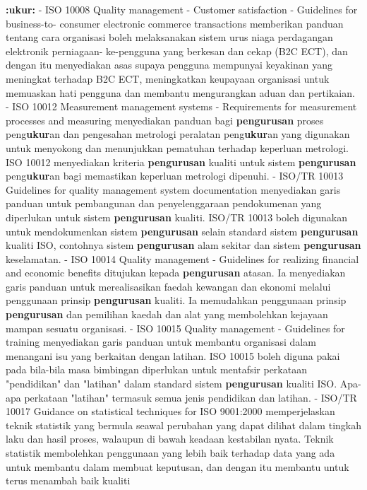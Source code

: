 \documentclass{article}
\begin{document}
\textbf{:ukur:} - ISO 10008 Quality management - Customer satisfaction - Guidelines for business-to-
 consumer electronic commerce transactions memberikan panduan tentang cara
 organisasi boleh melaksanakan sistem urus niaga perdagangan elektronik perniagaan-
 ke-pengguna yang berkesan dan cekap (B2C ECT), dan dengan itu menyediakan asas
 supaya pengguna mempunyai keyakinan yang meningkat terhadap B2C ECT,
 meningkatkan keupayaan organisasi untuk memuaskan hati pengguna dan membantu
 mengurangkan aduan dan pertikaian.
- ISO 10012 Measurement management systems - Requirements for measurement
 processes and measuring menyediakan panduan bagi \textbf{pengurusan} proses peng\textbf{ukur}an
 dan pengesahan metrologi peralatan peng\textbf{ukur}an yang digunakan untuk menyokong dan
 menunjukkan pematuhan terhadap keperluan metrologi. ISO 10012 menyediakan kriteria
 \textbf{pengurusan} kualiti untuk sistem \textbf{pengurusan} peng\textbf{ukur}an bagi memastikan keperluan
 metrologi dipenuhi.
- ISO/TR 10013 Guidelines for quality management system documentation menyediakan
 garis panduan untuk pembangunan dan penyelenggaraan pendokumenan yang
 diperlukan untuk sistem \textbf{pengurusan} kualiti. ISO/TR 10013 boleh digunakan untuk
 mendokumenkan sistem \textbf{pengurusan} selain standard sistem \textbf{pengurusan} kualiti
 ISO, contohnya sistem \textbf{pengurusan} alam sekitar dan sistem \textbf{pengurusan} keselamatan.
- ISO 10014 Quality management - Guidelines for realizing financial and economic
 benefits ditujukan kepada \textbf{pengurusan} atasan. Ia menyediakan garis panduan untuk
 merealisasikan faedah kewangan dan ekonomi melalui penggunaan prinsip \textbf{pengurusan}
 kualiti. Ia memudahkan penggunaan prinsip \textbf{pengurusan} dan pemilihan kaedah dan alat
 yang membolehkan kejayaan mampan sesuatu organisasi.
- ISO 10015 Quality management - Guidelines for training menyediakan garis panduan
 untuk membantu organisasi dalam menangani isu yang berkaitan dengan latihan. ISO
 10015 boleh diguna pakai pada bila-bila masa bimbingan diperlukan untuk mentafsir
 perkataan "pendidikan" dan "latihan" dalam standard sistem \textbf{pengurusan} kualiti ISO. Apa-
 apa perkataan "latihan" termasuk semua jenis pendidikan dan latihan.
- ISO/TR 10017 Guidance on statistical techniques for ISO 9001:2000 memperjelaskan
 teknik statistik yang bermula seawal perubahan yang dapat dilihat dalam tingkah laku dan
 hasil proses, walaupun di bawah keadaan kestabilan nyata. Teknik statistik
 membolehkan penggunaan yang lebih baik terhadap data yang ada untuk membantu
 dalam membuat keputusan, dan dengan itu membantu untuk terus menambah baik kualiti
\end{document}
